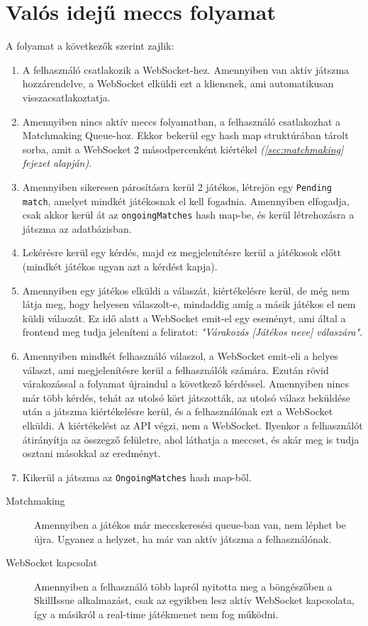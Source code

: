 \section{Valós idejű meccs folyamat}
A folyamat a következők szerint zajlik:
\begin{enumerate}
    \item A felhasználó csatlakozik a WebSocket-hez. Amennyiben van aktív játszma hozzárendelve, a WebSocket elküldi ezt a kliensnek, ami automatikusan visszacsatlakoztatja.
    \item Amennyiben nincs aktív meccs folyamatban, a felhasználó csatlakozhat a Matchmaking Queue-hoz. Ekkor bekerül egy hash map struktúrában tárolt sorba, amit a WebSocket 2 másodpercenként kiértékel \textit{(\ref{sec:matchmaking} fejezet alapján)}.
    \item Amennyiben sikeresen párosításra kerül 2 játékos, létrejön egy \texttt{Pending match}, amelyet mindkét játékosnak el kell fogadnia. Amennyiben elfogadja, csak akkor kerül át az \texttt{ongoingMatches} hash map-be, és kerül létrehozásra a játszma az adatbázisban.
    \item Lekérésre kerül egy kérdés, majd ez megjelenítésre kerül a játékosok előtt (mindkét játékos ugyan azt a kérdést kapja).
    \item Amennyiben egy játékos elküldi a válaszát, kiértékelésre kerül, de még nem látja meg, hogy helyesen válaszolt-e, mindaddig amíg a másik játékos el nem küldi válaszát. Ez idő alatt a WebSocket emit-el egy eseményt, ami által a frontend meg tudja jeleníteni a feliratot: \textit{"Várakozás [Játékos neve] válaszára"}.  
    \item Amennyiben mindkét felhasználó válaszol, a WebSocket emit-eli a helyes választ, ami megjelenítésre kerül a felhasználók számára. Ezután rövid várakozással a folyamat újraindul a következő kérdéssel. Amennyiben nincs már több kérdés, tehát az utolsó kört játszották, az utolsó válasz beküldése után a játszma kiértékelésre kerül, és a felhasználónak ezt a WebSocket elküldi. A kiértékelést az API végzi, nem a WebSocket. Ilyenkor a felhasználót átirányítja az összegző felületre, ahol láthatja a meccset, és akár meg is tudja osztani másokkal az eredményt.
    \item Kikerül a játszma az \texttt{OngoingMatches} hash map-ből.
\end{enumerate}

\begin{description}
    \item[Matchmaking] Amennyiben a játékos már meccskeresési queue-ban van, nem léphet be újra. Ugyanez a helyzet, ha már van aktív játszma a felhasználónak.
    \item[WebSocket kapcsolat] Amennyiben a felhasználó több lapról nyitotta meg a böngészőben a SkillIssue alkalmazást, csak az egyikben lesz aktív WebSocket kapcsolata, így a másikról a real-time játékmenet nem fog működni.
\end{description}